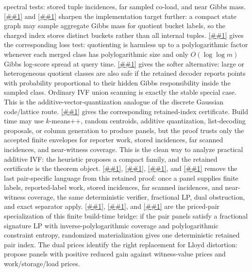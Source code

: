 \documentclass[10pt]{article}
\newcommand{\cref}[1]{\ref{##1}}
\newcommand{\Cref}[1]{\ref{##1}}
\theoremstyle{definition}
\begin{document}
spectral tests: stored tuple incidences, far sampled co-load, and near Gibbs
mass.  \Cref{lem:gibbs-aq-state-quotient} and
\cref{cor:finite-state-sampled-aq} sharpen the implementation target further:
a compact state graph may sample aggregate Gibbs mass for quotient bucket
labels, so the charged index stores distinct buckets rather than all internal
tuples.  \Cref{lem:stable-quotient-sampled-spectrum} gives the corresponding
loss test: quotienting is harmless up to a polylogarithmic factor whenever each
merged class has polylogarithmic size and only \(O(\log\log m)\) Gibbs log-score
spread at query time.  \Cref{lem:responsibility-thinned-quotient} gives the
softer alternative: large or heterogeneous quotient classes are also safe if
the retained decoder reports points with probability proportional to their
hidden Gibbs responsibility inside the sampled class.  Ordinary IVF union
scanning is exactly the stable special case.  This is the
additive-vector-quantization analogue of the discrete Gaussian code/lattice
route.
\Cref{prop:finite-retained-priced-pair} gives the corresponding retained-index
certificate.  Build time may use \(k\)-means++, random centroids, additive
quantization, list-decoding proposals, or column generation to produce panels,
but the proof trusts only the accepted finite envelopes for reporter work,
stored incidences, far scanned incidences, and near-witness coverage.  This is
the clean way to analyze practical additive IVF: the heuristic proposes a
compact family, and the retained certificate is the theorem object.
\Cref{prop:finite-retained-scored-label},
\cref{lem:finite-scored-label-lp-dual},
\cref{cor:scored-label-column-generation}, and
\cref{cor:fractional-scored-label-terminal} remove the last pair-specific
language from this retained proof: once a panel supplies finite labels,
reported-label work, stored incidences, far scanned incidences, and
near-witness coverage, the same deterministic verifier, fractional LP, dual
obstruction, and exact separator apply.
\Cref{lem:finite-priced-pair-lp-dual},
\cref{lem:fractional-priced-pair-materialization}, and
\cref{cor:fractional-priced-pair-terminal} are the priced-pair specialization
of this finite build-time bridge:
if the pair panels satisfy a fractional signature LP with inverse-polylogarithmic
coverage and polylogarithmic constraint entropy, randomized materialization
gives one deterministic retained pair index.  The dual prices identify the
right replacement for Lloyd distortion: propose panels with positive reduced
gain against witness-value prices and work/storage/load prices.
\end{document}
